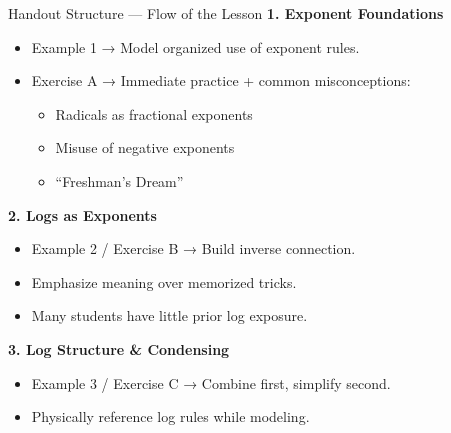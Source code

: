 \documentclass{beamer}
\begin{document}
\begin{frame}{Handout Structure — Flow of the Lesson}
\textbf{1. Exponent Foundations}
\begin{itemize}
    \item Example 1 → Model organized use of exponent rules.
    \item Exercise A → Immediate practice + common misconceptions:
    \begin{itemize}
        \item Radicals as fractional exponents
        \item Misuse of negative exponents
        \item “Freshman’s Dream”
    \end{itemize}
\end{itemize}

\bigskip

\textbf{2. Logs as Exponents}
\begin{itemize}
    \item Example 2 / Exercise B → Build inverse connection.
    \item Emphasize meaning over memorized tricks.
    \item Many students have little prior log exposure.
\end{itemize}

\bigskip

\textbf{3. Log Structure \& Condensing}
\begin{itemize}
    \item Example 3 / Exercise C → Combine first, simplify second.
    \item Physically reference log rules while modeling.
\end{itemize}
\end{frame}
\end{document}
